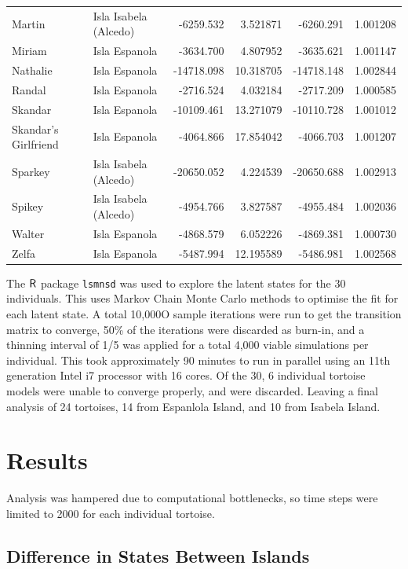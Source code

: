 \documentclass{article}
\begin{document}
\begin{table}
\begin{tabular}[t]{llrrrr}
Martin & Isla Isabela (Alcedo) & -6259.532 & 3.521871 & -6260.291 & 1.001208\\
Miriam & Isla Espanola & -3634.700 & 4.807952 & -3635.621 & 1.001147\\
Nathalie & Isla Espanola & -14718.098 & 10.318705 & -14718.148 & 1.002844\\
Randal & Isla Espanola & -2716.524 & 4.032184 & -2717.209 & 1.000585\\
Skandar & Isla Espanola & -10109.461 & 13.271079 & -10110.728 & 1.001012\\
Skandar's Girlfriend & Isla Espanola & -4064.866 & 17.854042 & -4066.703 & 1.001207\\
Sparkey & Isla Isabela (Alcedo) & -20650.052 & 4.224539 & -20650.688 & 1.002913\\
Spikey & Isla Isabela (Alcedo) & -4954.766 & 3.827587 & -4955.484 & 1.002036\\
Walter & Isla Espanola & -4868.579 & 6.052226 & -4869.381 & 1.000730\\
Zelfa & Isla Espanola & -5487.994 & 12.195589 & -5486.981 & 1.002568\\
\bottomrule
\end{tabular}
\end{table}

The \({\sf{R}}\) package \texttt{lsmnsd} was used to explore the latent
states for the 30 individuals. This uses Markov Chain Monte Carlo
methods to optimise the fit for each latent state. A total 10,000O
sample iterations were run to get the transition matrix to converge,
50\% of the iterations were discarded as burn-in, and a thinning
interval of 1/5 was applied for a total 4,000 viable simulations per
individual. This took approximately 90 minutes to run in parallel using
an 11th generation Intel i7 processor with 16 cores. Of the 30, 6
individual tortoise models were unable to converge properly, and were
discarded. Leaving a final analysis of 24 tortoises, 14 from Espanlola
Island, and 10 from Isabela Island.

\hypertarget{results}{%
\section{Results}\label{results}}

Analysis was hampered due to computational bottlenecks, so time steps
were limited to 2000 for each individual tortoise.

\hypertarget{difference-in-states-between-islands}{%
\subsection{Difference in States Between
Islands}\label{difference-in-states-between-islands}}
\end{document}
